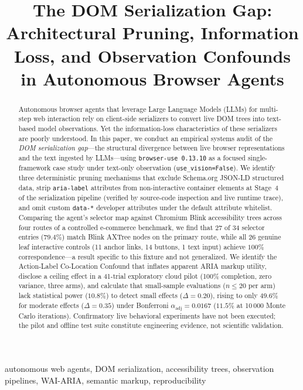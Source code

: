 \documentclass[conference]{IEEEtran}
\title{The DOM Serialization Gap: Architectural Pruning, Information Loss, and Observation Confounds in Autonomous Browser Agents}
\author{
  \IEEEauthorblockN{[Author Name Placeholder]}
  \IEEEauthorblockA{[Department Placeholder]\\
  [Institution Placeholder]\\
  [email@placeholder.edu]}
}
\begin{document}
\maketitle

\begin{abstract}
Autonomous browser agents that leverage Large Language Models (LLMs) for multi-step web interaction rely on client-side serializers to convert live DOM trees into text-based model observations. Yet the information-loss characteristics of these serializers are poorly understood. In this paper, we conduct an empirical systems audit of the \emph{DOM serialization gap}---the structural divergence between live browser representations and the text ingested by LLMs---using \texttt{browser-use 0.13.10} as a focused single-framework case study under text-only observation (\texttt{use\_vision=False}). We identify three deterministic pruning mechanisms that exclude Schema.org JSON-LD structured data, strip \texttt{aria-label} attributes from non-interactive container elements at Stage~4 of the serialization pipeline (verified by source-code inspection and live runtime trace), and omit custom \texttt{data-*} developer attributes under the default attribute whitelist. Comparing the agent's selector map against Chromium Blink accessibility trees across four routes of a controlled e-commerce benchmark, we find that 27 of 34 selector entries ($79.4\%$) match Blink AXTree nodes on the primary route, while all 26 genuine leaf interactive controls (11 anchor links, 14 buttons, 1 text input) achieve $100\%$ correspondence---a result specific to this fixture and not generalized. We identify the Action-Label Co-Location Confound that inflates apparent ARIA markup utility, disclose a ceiling effect in a 41-trial exploratory cloud pilot (100\% completion, zero variance, three arms), and calculate that small-sample evaluations ($n \le 20$ per arm) lack statistical power ($10.8\%$) to detect small effects ($\Delta = 0.20$), rising to only $49.6\%$ for moderate effects ($\Delta = 0.35$) under Bonferroni $\alpha_{\mathrm{adj}} = 0.0167$ ($11.5\%$ at 10\,000 Monte Carlo iterations). Confirmatory live behavioral experiments have not been executed; the pilot and offline test suite constitute engineering evidence, not scientific validation.
\end{abstract}

\begin{IEEEkeywords}
autonomous web agents, DOM serialization, accessibility trees, observation pipelines, WAI-ARIA, semantic markup, reproducibility
\end{IEEEkeywords}
\end{document}
